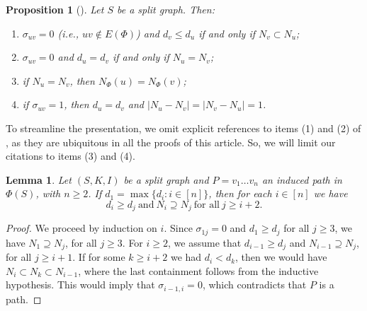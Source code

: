 \documentclass[11pt]{elsarticle}
\newtheorem{lemma}[lemma]{Lemma}
\newtheorem{proposition}[proposition]{Proposition}
\begin{document}
\begin{proposition}[\cite{pastine2025simple}]
	\label{prop.basicas.sigma_uv}
	Let $S$ be a split graph. Then:
	\begin{enumerate}
		\item $\sigma_{uv}=0$ (i.e., $uv\notin E(\Phi)$) and $d_v \leq d_u$ if and only if $N_v \subset N_u$; 
		
		\item $\sigma_{uv}=0$ and $d_u =d_v$ if and only if $N_u = N_v$;
		
		\item if $N_u = N_v $, then $N_{\Phi}(u)=N_{\Phi}(v)$;
		
		\item if $\sigma_{uv}=1$, then $d_u =d_v$ and $|N_u -N_v |=|N_v -N_u |=1$.
		
		
		
		
	\end{enumerate}
\end{proposition}

To streamline the presentation, we omit explicit references to items (1) and (2) of , as they are ubiquitous in all the proofs of this article. So, we will limit our citations to items (3) and (4).

\begin{lemma}
	\label{lema.camino.inducido.en.Phi}
	Let $(S,K,I)$ be a split graph and $P=v_1\ldots v_n$ an induced path in $\Phi(S)$, with $n\geq 2$. If $d_1=\max\{d_i:i\in[n]\}$, then for each $i\in[n]$ we have
	\begin{equation*}
		d_i\geq d_j \ \text{and} \ N_i\supseteq N_j \ \text{for all} \ j\geq i+2.
	\end{equation*}
\end{lemma}

\begin{proof}
	We proceed by induction on $i$. Since $\sigma_{1j}=0$ and $d_1 \geq d_j$ for all $j\geq 3$, we have $N_1\supseteq N_j$, for all $j\geq 3$. For $i\geq 2$, we assume that $d_{i-1}\geq d_j$ and $N_{i-1}\supseteq N_j$, for all $j\geq i+1$. If for some $k\geq i+2$ we had $d_i<d_k$, then we would have $N_i\subset N_k\subset N_{i-1}$, where the last containment follows from the inductive hypothesis. This would imply that $\sigma_{i-1,i}=0$, which contradicts that $P$ is a path.
\end{proof}
\end{document}
